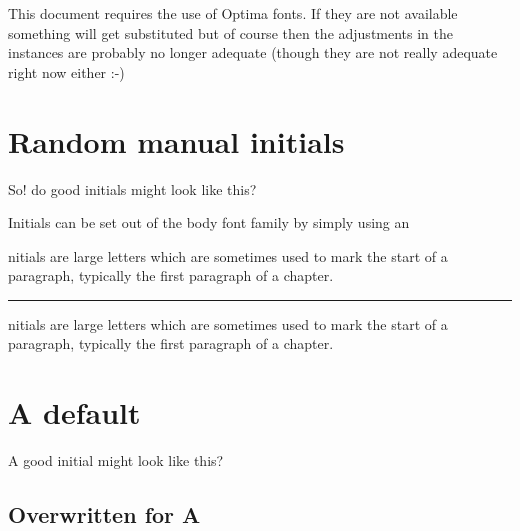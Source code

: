 \documentclass[twocolumn]{article}
\begin{document}
This document requires the use of Optima fonts. If they are not
available something will get substituted but of course then the
adjustments in the instances are probably no longer adequate (though
they are not really adequate right now either :-)

\section{Random manual initials}

\ExtendedInitial*[
    initial-font    = \fontfamily{pop}\fontsize{40}{40}\selectfont,
    v-adjust        = 1pt,
    h-adjust        = -2pt,
    nominal-height  = 20pt,]
So! do good
 initials might look like this?
\smallsample


\ExtendedInitial*[
  initial-font    = \fontsize{40}{40}\selectfont,
  parshape-list   = {0pt,0pt,0pt},
  v-adjust        = -4pt,
  h-adjust        = 0pt,
  text-sep       = 1pt,
  nominal-height  = 0pt,
  initial-format  = \llap{#1}, ]
Initials can be set out of the body font family by simply using an \smallsample


\ExtendedInitial*[
  initial-font    = \fontsize{40}{40}\selectfont,
  parshape-list   = {0pt,0pt},
  v-adjust        = 0pt,
  h-adjust        = 0pt,
  text-sep       = 0pt,
  nominal-height  = 0pt,]
{$\Im$}nitials are large letters which are sometimes used to mark the start
of a paragraph, typically the first paragraph of a chapter.

\hrule
\ExtendedInitial*[
  initial-font    = \fontsize{40}{40}\selectfont,
  parshape-list   = {0pt,0pt},
  v-adjust        = 0pt,
  h-adjust        = 0pt,
  text-sep       = 0pt,
  nominal-height  = 0pt,]
{$\Im$}nitials are large letters which are sometimes used to mark the start
of a paragraph, typically the first paragraph of a chapter.



\section{A default}


\Initial A good initial might look like this?
\smallsample

\subsection{Overwritten for A}
\end{document}
